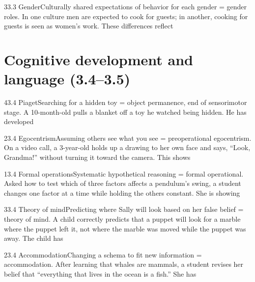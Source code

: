 \documentclass[11pt]{article}
\begin{document}
\begin{q}{3}{3.3 Gender}{Culturally shared expectations of behavior for each gender = gender roles.}
In one culture men are expected to cook for guests; in another, cooking for guests is seen as women's work. These differences reflect
\end{q}

\section{Cognitive development and language (3.4--3.5)}

\begin{q}{4}{3.4 Piaget}{Searching for a hidden toy = object permanence, end of sensorimotor stage.}
A 10-month-old pulls a blanket off a toy he watched being hidden. He has developed
\end{q}

\begin{q}{2}{3.4 Egocentrism}{Assuming others see what you see = preoperational egocentrism.}
On a video call, a 3-year-old holds up a drawing to her own face and says, ``Look, Grandma!'' without turning it toward the camera. This shows
\end{q}

\begin{q}{1}{3.4 Formal operations}{Systematic hypothetical reasoning = formal operational.}
Asked how to test which of three factors affects a pendulum's swing, a student changes one factor at a time while holding the others constant. She is showing
\end{q}

\begin{q}{3}{3.4 Theory of mind}{Predicting where Sally will look based on her false belief = theory of mind.}
A child correctly predicts that a puppet will look for a marble where the puppet left it, not where the marble was moved while the puppet was away. The child has
\end{q}

\begin{q}{2}{3.4 Accommodation}{Changing a schema to fit new information = accommodation.}
After learning that whales are mammals, a student revises her belief that ``everything that lives in the ocean is a fish.'' She has
\end{q}
\end{document}
